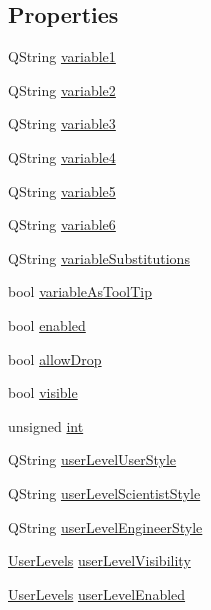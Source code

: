 \subsection*{Properties}
\begin{DoxyCompactItemize}
\item 
QString \hyperlink{classQEShape_ab5e680419c4f3586303ac436241fac79}{variable1}
\item 
QString \hyperlink{classQEShape_ae897cceb66ecad101bc4bd7899fcef5a}{variable2}
\item 
QString \hyperlink{classQEShape_aa602068abe671e12dec4be3e1fd6997a}{variable3}
\item 
QString \hyperlink{classQEShape_a070d6c64cd7a1573890f046d4c7ef5f4}{variable4}
\item 
QString \hyperlink{classQEShape_a63e072e89a4f7f09f074a786d02a02f3}{variable5}
\item 
QString \hyperlink{classQEShape_a04779df1e2810595e1b5af2618b31b86}{variable6}
\item 
QString \hyperlink{classQEShape_ac7187ecf5f9dd9fe1d1a0c90e88497ba}{variableSubstitutions}
\item 
bool \hyperlink{classQEShape_ab53a66fe65ec64ca6aee6fe11b3a4dc0}{variableAsToolTip}
\item 
bool \hyperlink{classQEShape_a15eb8c61fc2f76a3c3118f26f5a29f5e}{enabled}
\item 
bool \hyperlink{classQEShape_a010d39e1e7ed6d369ef672c55d68e731}{allowDrop}
\item 
bool \hyperlink{classQEShape_a756bf7838f40027bd382d1ef28b10f1f}{visible}
\item 
unsigned \hyperlink{classQEShape_abd83932e92ddc3be44eaa9e2409a6ea6}{int}
\item 
QString \hyperlink{classQEShape_a47d835d06b0143a10a414e706fb3c37f}{userLevelUserStyle}
\item 
QString \hyperlink{classQEShape_aa71e87349e8754ca870dac8509563ffd}{userLevelScientistStyle}
\item 
QString \hyperlink{classQEShape_a8a26fa66369d3e3e6f9e308e2ebaa74d}{userLevelEngineerStyle}
\item 
\hyperlink{classQEShape_a090921156d1b46560ff0fc1bacad18dd}{UserLevels} \hyperlink{classQEShape_aa02618ef4969857af73b0fc5278e2104}{userLevelVisibility}
\item 
\hyperlink{classQEShape_a090921156d1b46560ff0fc1bacad18dd}{UserLevels} \hyperlink{classQEShape_a8b2158632ac9f2cd70692650c3cd594f}{userLevelEnabled}
\item 

\end{DoxyCompactItemize}
